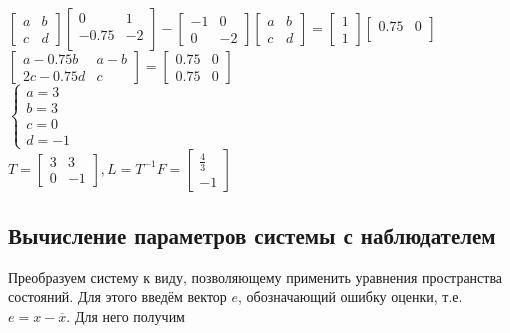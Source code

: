 	\noindent$\begin{bmatrix} a & b \\ c & d \end{bmatrix}
	\begin{bmatrix}
	0 & 1 \\
	-0.75 & -2 \\
	\end{bmatrix}-
	\begin{bmatrix} -1 & 0 \\ 0 & -2 \end{bmatrix}
	\begin{bmatrix} a & b \\ c & d \end{bmatrix}=
	\begin{bmatrix} 1 \\ 1 \end{bmatrix}
	\begin{bmatrix}
	0.75 & 0 \\
	\end{bmatrix}$\\
	$\begin{bmatrix} a - 0.75b & a-b \\ 2c - 0.75d & c \end{bmatrix}=
	\begin{bmatrix} 0.75 & 0 \\ 0.75 & 0 \end{bmatrix}$\\
$		\begin{cases}
		\text{$a=3$} \\
		\text{$b=3$} \\
		\text{$c=0$} \\
		\text{$d=-1$} 
	\end{cases}
$\\
	$T=\begin{bmatrix} 3 & 3 \\ 0 & -1 \end{bmatrix}, L=T^{-1}F=\begin{bmatrix} \frac{4}{3} \\ -1 \end{bmatrix}$

\subsection{Вычисление параметров системы с наблюдателем}

Преобразуем систему к виду, позволяющему применить уравнения пространства состояний. Для этого введём вектор $e$, обозначающий ошибку оценки, т.е. $e=x-\overline{x}$. Для него получим\\

